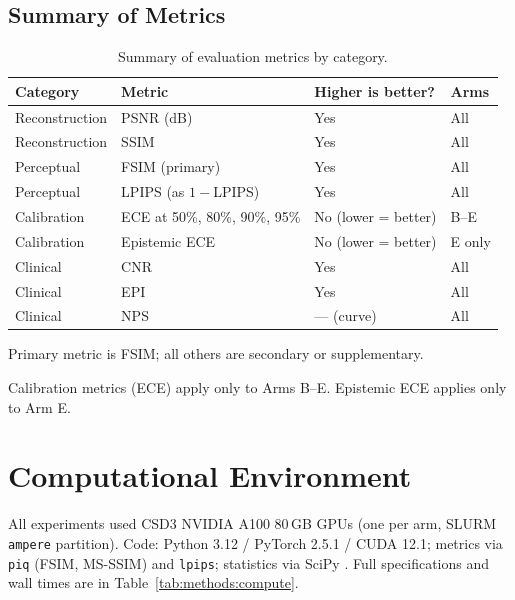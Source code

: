 \documentclass[12pt, a4paper, twoside, openright]{book}
\begin{document}
\subsection{Summary of Metrics}
\label{sec:methods:evaluation:summary}

\begin{table}[htbp]
\centering
\caption{Summary of evaluation metrics by category.}
\label{tab:methods:metrics}
\begin{threeparttable}
\begin{tabular}{llll}
\toprule
\textbf{Category} & \textbf{Metric} & \textbf{Higher is better?} & \textbf{Arms} \\
\midrule
Reconstruction & PSNR (dB) & Yes & All \\
Reconstruction & SSIM & Yes & All \\
Perceptual & FSIM (primary) & Yes & All \\
Perceptual & LPIPS (as $1-$LPIPS) & Yes & All \\
Calibration & ECE at 50\%, 80\%, 90\%, 95\% & No (lower = better) & B--E \\
Calibration & Epistemic ECE & No (lower = better) & E only \\
Clinical & CNR & Yes & All \\
Clinical & EPI & Yes & All \\
Clinical & NPS & --- (curve) & All \\
\bottomrule
\end{tabular}
\begin{tablenotes}
\footnotesize
\item Primary metric is FSIM; all others are secondary or supplementary.
\item Calibration metrics (ECE) apply only to Arms B--E. Epistemic ECE applies only to Arm E.
\end{tablenotes}
\end{threeparttable}
\end{table}

\section{Computational Environment}
\label{sec:methods:compute}

All experiments used CSD3 NVIDIA A100 80\,GB GPUs (one per arm, SLURM \texttt{ampere} partition). Code: Python 3.12 / PyTorch 2.5.1 / CUDA 12.1; metrics via \texttt{piq} (FSIM, MS-SSIM) and \texttt{lpips}; statistics via SciPy \cite{virtanen_scipy_2020}. Full specifications and wall times are in Table~\ref{tab:methods:compute}.
\end{document}
